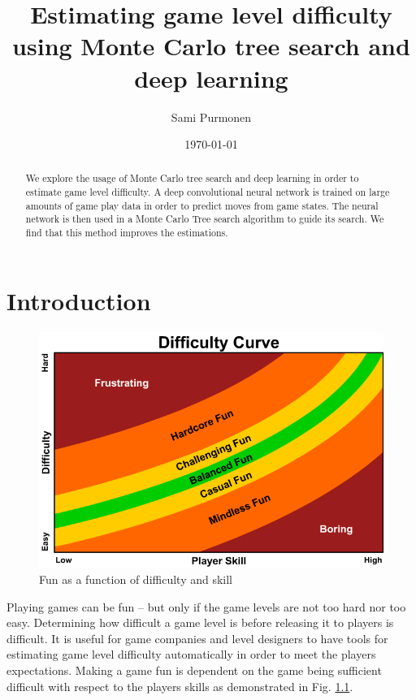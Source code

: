 \documentclass{kththesis}
\title{Estimating game level difficulty using Monte Carlo tree search and deep learning}
\author{Sami Purmonen}
\date{\today}
\begin{document}
\flyleaf

\begin{abstract}
We explore the usage of Monte Carlo tree search and deep learning in order to estimate game level difficulty. A deep convolutional neural network is trained on large amounts of game play data in order to predict moves from game states. The neural network is then used in a Monte Carlo Tree search algorithm to guide its search. We find that this method improves the estimations.
\end{abstract}

\clearpage

\begin{otherlanguage}{swedish}
  \begin{abstract}
  \end{abstract}
\end{otherlanguage}

\cleardoublepage

\tableofcontents


\mainmatter

\chapter{Introduction}
\begin{figure}
\label{fig:difficulty_curve}
\includegraphics[width=\textwidth]{images/difficulty_curve.png}
\caption{Fun as a function of difficulty and skill}
\end{figure}
Playing games can be fun – but only if the game levels are not too hard nor too easy. Determining how difficult a game level is before releasing it to players is difficult. It is useful for game companies and level designers to have tools for estimating game level difficulty automatically in order to meet the players expectations. Making a game fun is dependent on the game being sufficient difficult with respect to the players skills as demonstrated in Fig. \ref{fig:difficulty_curve}.
\end{document}
